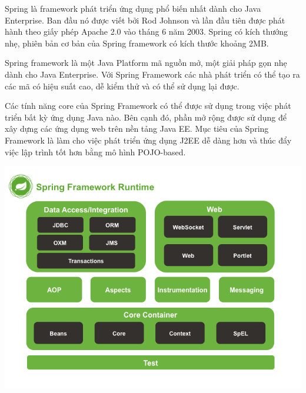 Spring là framework phát triển ứng dụng phổ biến nhất dành cho Java Enterprise. Ban đầu nó được viết bởi Rod Johnson và lần đầu tiên được phát hành theo giấy phép Apache 2.0 vào tháng 6 năm 2003. Spring có kích thướng nhẹ, phiên bản cơ bản của Spring framework có kích thước khoảng 2MB.

Spring framework là một Java Platform mã nguồn mở, một giải pháp gọn nhẹ dành cho Java Enterprise. Với Spring Framework các nhà phát triển có thể tạo ra các mã có hiệu suất cao, dễ kiểm thử và có thể sử dụng lại được.

Các tính năng core của Spring Framework có thể được sử dụng trong việc phát triển bất kỳ ứng dụng Java nào. Bên cạnh đó, phần mở rộng được sử dụng để xây dựng các ứng dụng web trên nền tảng Java EE. Mục tiêu của Spring Framework là làm cho việc phát triển ứng dụng J2EE dễ dàng hơn và thúc đẩy việc lập trình tốt hơn bằng mô hình POJO-based.
\begin{center}
  \captionsetup{type=figure}
  \includegraphics[width=15cm]{img/spring_runtime.png}
\end{center}


